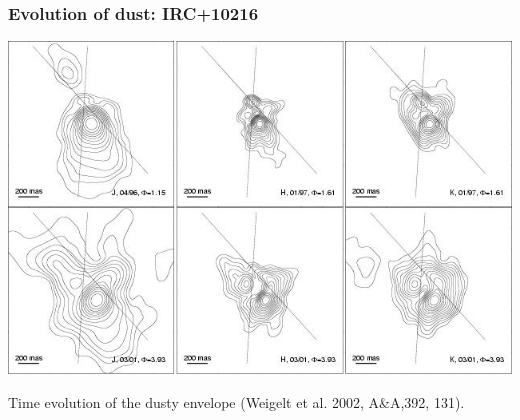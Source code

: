 \begin{frame}\frametitle{Evolution of dust: IRC+10216}

\begin{center}
\includegraphics[width=!,height=0.6\textwidth]{./D/irc+10216_evolution.jpg}
\end{center}
Time evolution of the dusty envelope  (Weigelt et al. 2002, A\&A,392,
131).

\end{frame}
